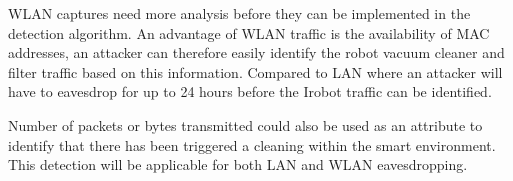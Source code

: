 \gls{WLAN} captures need more analysis before they can be implemented in the detection algorithm. An advantage of \gls{WLAN} traffic is the availability of \gls{MAC} addresses, an attacker can therefore easily identify the robot vacuum cleaner and filter traffic based on this information. Compared to \gls{LAN} where an attacker will have to eavesdrop for up to 24 hours before the Irobot traffic can be identified. 

Number of packets or bytes transmitted could also be used as an attribute to identify that there has been triggered a cleaning within the smart environment. This detection will be applicable for both \gls{LAN} and \gls{WLAN} eavesdropping.  